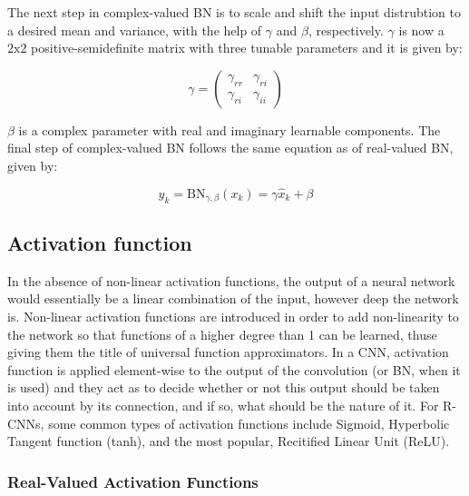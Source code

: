 The next step in complex-valued BN is to scale and shift the input distrubtion to a desired mean and variance, with the help of $\gamma$ and $\beta$, respectively. $\gamma$ is now a $\mathrm{2} \mathrm{x} \mathrm{2}$ positive-semidefinite matrix with three tunable parameters and it is given by:

\begin{equation}
\gamma = \begin{pmatrix} \gamma_{rr} & \gamma_{ri}\\ \gamma_{ri} & \gamma_{ii} \end{pmatrix} 
\label{eqcbn4}
\end{equation}

$\beta$ is a complex parameter with real and imaginary learnable components. The final step of complex-valued BN follows the same equation as of real-valued BN, given by:

 \begin{equation}
y_{k} = \mathrm{BN}_{\gamma,\beta}(x_{k}) = \gamma\hat{x}_{k} + \beta
\label{eqcbn5}
\end{equation}

 \subsection{Activation function}\label{ssec:act_fn}
 In the absence of non-linear activation functions, the output of a neural network would essentially be a linear combination of the input, however deep the network is. Non-linear activation functions are introduced in order to add non-linearity to the network so that functions of a higher degree than 1 can be learned, thuse giving them the title of universal function approximators. In a CNN, activation function is applied element-wise to the output of the convolution (or BN, when it is used) and they act as to decide whether or not this output should be taken into account by its connection, and if so, what should be the nature of it. For $\mathrm{R}$-CNNs, some common types of activation functions include Sigmoid, Hyperbolic Tangent function (tanh), and the most popular, Recitified Linear Unit (ReLU).
 
 
  \subsubsection{Real-Valued Activation Functions}
